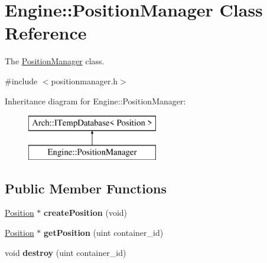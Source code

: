 \hypertarget{classEngine_1_1PositionManager}{}\section{Engine\+:\+:Position\+Manager Class Reference}
\label{classEngine_1_1PositionManager}


The \hyperlink{classEngine_1_1PositionManager}{Position\+Manager} class.  




{\ttfamily \#include $<$positionmanager.\+h$>$}

Inheritance diagram for Engine\+:\+:Position\+Manager\+:\begin{figure}[H]
\begin{center}
\leavevmode
\includegraphics[height=2.000000cm]{classEngine_1_1PositionManager}
\end{center}
\end{figure}
\subsection*{Public Member Functions}
\begin{DoxyCompactItemize}
\item 
\hypertarget{classEngine_1_1PositionManager_a3ffde9f48538c6a16d9ec84e8c73dd21}{}\hyperlink{classEngine_1_1Position}{Position} $\ast$ {\bfseries create\+Position} (void)\label{classEngine_1_1PositionManager_a3ffde9f48538c6a16d9ec84e8c73dd21}

\item 
\hypertarget{classEngine_1_1PositionManager_ab25d55ad5c140fa7f71e2303b74fe6da}{}\hyperlink{classEngine_1_1Position}{Position} $\ast$ {\bfseries get\+Position} (uint container\+\_\+id)\label{classEngine_1_1PositionManager_ab25d55ad5c140fa7f71e2303b74fe6da}

\item 
\hypertarget{classEngine_1_1PositionManager_a77166e3a79017c8f2cb179828812bc31}{}void {\bfseries destroy} (uint container\+\_\+id)\label{classEngine_1_1PositionManager_a77166e3a79017c8f2cb179828812bc31}

\end{DoxyCompactItemize}



